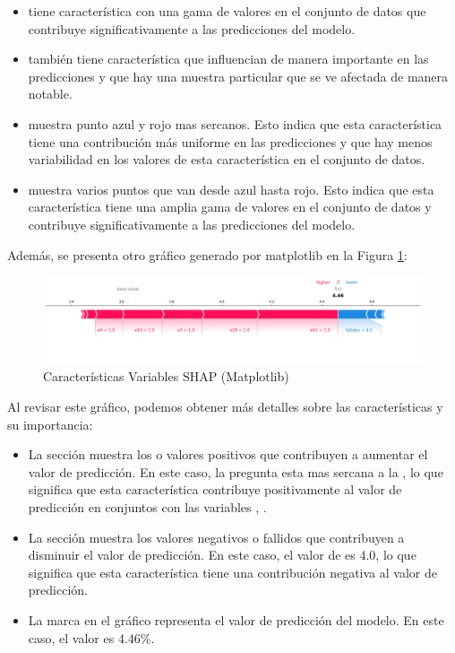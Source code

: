 \begin{itemize}
    \item {} tiene característica con una gama de valores en el conjunto de datos que contribuye significativamente a las predicciones del modelo.
    \item {} también tiene característica que influencian de manera importante en las predicciones y que hay una muestra particular que se ve afectada de manera notable.
    \item {} muestra punto azul y rojo mas sercanos. Esto indica que esta característica tiene una contribución más uniforme en las predicciones y que hay menos variabilidad en los valores de esta característica en el conjunto de datos.
    \item {} muestra varios puntos que van desde azul hasta rojo. Esto indica que esta característica tiene una amplia gama de valores en el conjunto de datos y contribuye significativamente a las predicciones del modelo.
\end{itemize}

Además, se presenta otro gráfico generado por matplotlib en la Figura \ref{fig:caract_var_shap_mat_lr2}:

\begin{figure}[H]
    \centering
    \includegraphics[width=1\textwidth]{img/shap_lr/shapForcePlot_lr2.png}
    \caption{Características Variables SHAP (Matplotlib)}
    \label{fig:caract_var_shap_mat_lr2}
\end{figure}

Al revisar este gráfico, podemos obtener más detalles sobre las características y su importancia:

\begin{itemize}
    \item La sección  muestra los  o valores positivos que contribuyen a aumentar el valor de predicción. En este caso, la pregunta  esta mas sercana a la , lo que significa que esta característica contribuye positivamente al valor de predicción en conjuntos con las variables , .
    \item La sección  muestra los valores negativos o fallidos que contribuyen a disminuir el valor de predicción. En este caso, el valor de  es 4.0, lo que significa que esta característica tiene una contribución negativa al valor de predicción.
    \item La marca  en el gráfico representa el valor de predicción del modelo. En este caso, el valor es 4.46\%.
\end{itemize}



